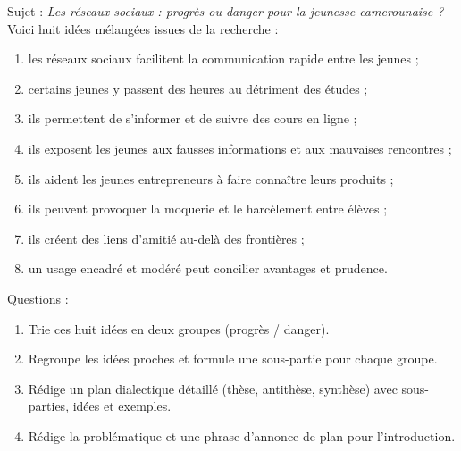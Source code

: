 \documentclass[11pt]{article}
\begin{document}
\begin{exercice}
Sujet : \emph{Les réseaux sociaux : progrès ou danger pour la jeunesse camerounaise ?}
Voici huit idées mélangées issues de la recherche :
\begin{enumerate}
\item[a.] les réseaux sociaux facilitent la communication rapide entre les jeunes ;
\item[b.] certains jeunes y passent des heures au détriment des études ;
\item[c.] ils permettent de s'informer et de suivre des cours en ligne ;
\item[d.] ils exposent les jeunes aux fausses informations et aux mauvaises rencontres ;
\item[e.] ils aident les jeunes entrepreneurs à faire connaître leurs produits ;
\item[f.] ils peuvent provoquer la moquerie et le harcèlement entre élèves ;
\item[g.] ils créent des liens d'amitié au-delà des frontières ;
\item[h.] un usage encadré et modéré peut concilier avantages et prudence.
\end{enumerate}
Questions :
\begin{enumerate}
\item Trie ces huit idées en deux groupes (progrès / danger).
\item Regroupe les idées proches et formule une sous-partie pour chaque groupe.
\item Rédige un plan dialectique détaillé (thèse, antithèse, synthèse) avec sous-parties, idées et exemples.
\item Rédige la problématique et une phrase d'annonce de plan pour l'introduction.
\end{enumerate}
\end{exercice}
\end{document}
